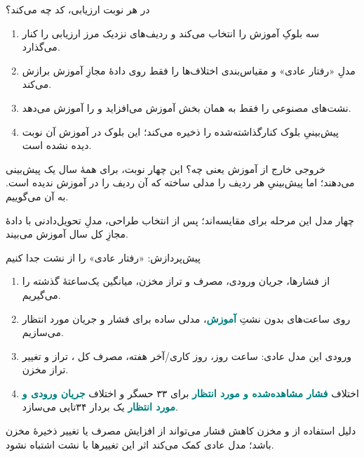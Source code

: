 \documentclass[aspectratio=169,11pt]{beamer}
\newcommand{\key}[1]{\textcolor{teal}{\textbf{#1}}}
\newcommand{\eng}[1]{\lr{#1}}
\begin{document}
\begin{frame}{در هر نوبت ارزیابی، کد چه می‌کند؟}
  \begin{enumerate}
  \item سه بلوکِ آموزش را انتخاب می‌کند و ردیف‌های نزدیک مرز ارزیابی را کنار می‌گذارد.
  \item مدلِ «رفتار عادی» و مقیاس‌بندی اختلاف‌ها را فقط روی دادهٔ مجازِ آموزش برازش می‌کند.
  \item نشت‌های مصنوعی را فقط به همان بخش آموزش می‌افزاید و \eng{MLP} را آموزش می‌دهد.
  \item پیش‌بینیِ بلوک کنارگذاشته‌شده را ذخیره می‌کند؛ این بلوک در آموزش آن نوبت دیده نشده است.
  \end{enumerate}
  \begin{block}{خروجی خارج از آموزش یعنی چه؟}
  این چهار نوبت، برای همهٔ سال یک پیش‌بینی می‌دهند؛ اما پیش‌بینیِ هر ردیف را مدلی ساخته که آن ردیف را در آموزش ندیده است. به آن \eng{out-of-fold (OOF)} می‌گوییم.
  \end{block}
  \small\color{gray}چهار مدل این مرحله برای مقایسه‌اند؛ پس از انتخاب طراحی، مدلِ تحویل‌دادنی با دادهٔ مجازِ کل سال آموزش می‌بیند.
\end{frame}

\begin{frame}{پیش‌پردازش: «رفتار عادی» را از نشت جدا کنیم}
  \begin{enumerate}
  \item از فشارها، جریان ورودی، مصرف \eng{AMR} و تراز مخزن، میانگین یک‌ساعتهٔ گذشته را می‌گیریم.
  \item روی ساعت‌های بدون نشتِ \key{آموزش}، مدلی ساده برای فشار و جریان مورد انتظار می‌سازیم.
  \item ورودی این مدل عادی: ساعت روز، روز کاری/آخر هفته، مصرف کل \eng{AMR}، تراز و تغییر تراز مخزن.
  \item اختلاف \key{فشار مشاهده‌شده و مورد انتظار} برای ۳۳ حسگر و اختلاف \key{جریان ورودی و مورد انتظار} یک بردار ۳۴تایی می‌سازد.
  \end{enumerate}
  \begin{block}{دلیل استفاده از \eng{AMR} و مخزن}
  کاهش فشار می‌تواند از افزایش مصرف یا تغییر ذخیرهٔ مخزن باشد؛ مدل عادی کمک می‌کند اثر این تغییرها با نشت اشتباه نشود.
  \end{block}
\end{frame}
\end{document}
